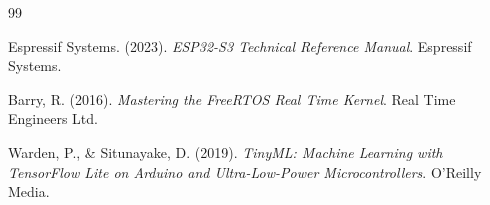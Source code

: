 \newpage
\renewcommand{\bibname}{Tài liệu tham khảo}
\renewcommand{\refname}{Tài liệu tham khảo}
\begin{thebibliography}{99}

Espressif Systems. (2023). \textit{ESP32-S3 Technical Reference Manual}. Espressif Systems.

Barry, R. (2016). \textit{Mastering the FreeRTOS Real Time Kernel}. Real Time Engineers Ltd.

Warden, P., \& Situnayake, D. (2019). \textit{TinyML: Machine Learning with TensorFlow Lite on Arduino and Ultra-Low-Power Microcontrollers}. O'Reilly Media.

\end{thebibliography}